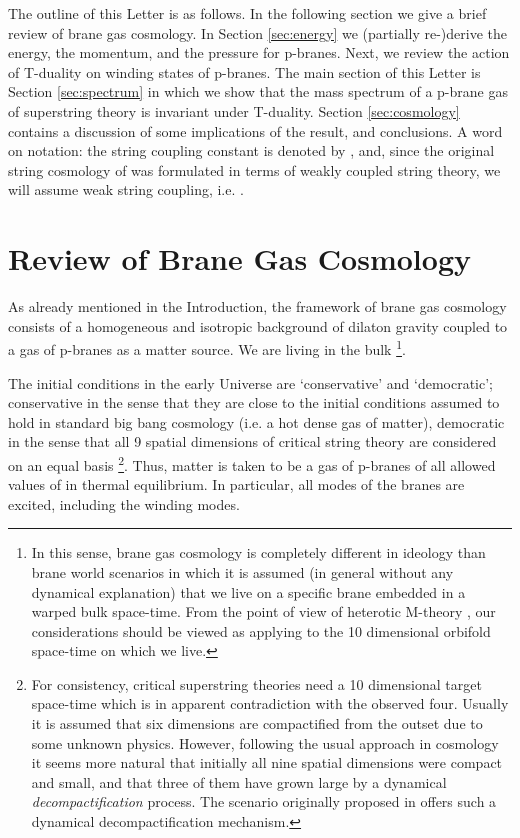 \documentclass[a4paper,twocolumn,nofootinbib,tightenlines,prd,aps,
               superscriptaddress]{revtex4} %
\begin{document}
The outline of this Letter is as follows. In the following section
we give a brief review of brane gas cosmology. In Section
\ref{sec:energy} we (partially re-)derive the energy, the
momentum, and the pressure for  p-branes.
Next, we review the action of T-duality on winding states of
p-branes. The main section of this Letter is Section
\ref{sec:spectrum} in which we show that the mass spectrum of a
p-brane gas of superstring theory is invariant under T-duality.
Section \ref{sec:cosmology} contains a discussion of some
implications of the result, and conclusions. A word on notation:
the string coupling constant is denoted by \coordHE{}, and, since the
original string cosmology of \cite{Brandenberger:1989aj} was
formulated in terms of weakly coupled string theory, we will
assume weak string coupling, i.e. \coordHE{}.


\section{Review of Brane Gas Cosmology}
\label{sec:review}

As already mentioned in the Introduction, the framework of brane
gas cosmology consists of a homogeneous and isotropic background
of dilaton gravity coupled to a gas of p-branes as a matter
source. We are living in the bulk \footnote{In this sense, brane
gas cosmology is completely different in ideology than brane world
scenarios in which it is assumed (in general without any dynamical
explanation) that we live on a specific brane embedded in a warped
bulk space-time. From the point of view of heterotic M-theory
\cite{Horava:1996qa}, our considerations should be viewed as
applying to the 10 dimensional orbifold space-time on which we
live.}.

The initial conditions in the early Universe are `conservative'
and `democratic'; conservative in the sense that they are close to
the initial conditions assumed to hold in standard big bang
cosmology (i.e. a hot dense gas of matter), democratic in the
sense that all 9 spatial dimensions of critical string theory are
considered on an equal basis \footnote{For consistency, critical
superstring theories need a 10 dimensional target space-time which
is in apparent contradiction with the observed four. Usually it is
assumed that six dimensions are compactified from the outset due
to some unknown physics. However, following the usual approach in
cosmology it seems more natural that initially all nine spatial
dimensions were compact and small, and that three of them have
grown large by a dynamical {\em decompactification} process. The
scenario originally proposed in \cite{Brandenberger:1989aj} offers
such a dynamical decompactification mechanism.}. Thus, matter is
taken to be a gas of p-branes of all allowed values of \coordHE{} in
thermal equilibrium. In par\-ti\-cu\-lar, all modes of the branes
are excited, including the winding modes.
\end{document}
